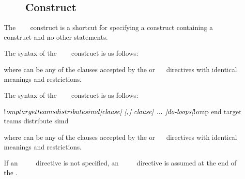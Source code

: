 \subsection{~~~ Construct}
\label{subsec:target teams distribute simd construct}
\summary
The ~~~ construct is a shortcut for specifying a  construct
containing a ~~ construct and no other statements.

\syntax
\begin{ccppspecific}
The syntax of the ~~~ construct is as follows:

\begin{ompcPragma}
#pragma omp target teams distribute simd \plc{\}
            \plc{[clause[ [},\plc{] clause] ...  ] new-line}
   \plc{for-loops}
\end{ompcPragma}

where  can be any of the clauses accepted by the  or
~~ directives with identical meanings and restrictions.
\end{ccppspecific}

\begin{fortranspecific}
The syntax of the ~~~ construct is as follows:

\begin{ompfPragma}
!$omp target teams distribute simd \plc{[clause[ [},\plc{] clause] ... ]}
    \plc{do-loops}
\plc{[}!$omp end target teams distribute simd\plc{]}
\end{ompfPragma}

where  can be any of the clauses accepted by the  or
~~ directives with identical meanings and restrictions.

If an ~~~~ directive is not specified, an
~~~~ directive is assumed at the end of the .
\end{fortranspecific}

